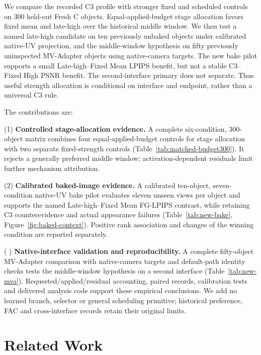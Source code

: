 \documentclass[times,twocolumn,final]{elsarticle}
\providecommand{\DIFadd}[1]{{\protect\color{blue} \sf #1}} %
\providecommand{\DIFaddbegin}{} %
\providecommand{\DIFaddend}{} %
\begin{document}
 
 \DIFaddbegin \DIFadd{We compare the recorded C3 profile with stronger fixed and scheduled controls on 300 held-out Fresh C objects. Equal-applied-budget stage allocation favors fixed mean and late-high over the historical middle window. We then test a named late-high candidate on ten previously unbaked objects under calibrated native-UV projection, and the middle-window hypothesis on fifty previously uninspected MV-Adapter objects using native-camera targets. The new bake pilot supports a small Late-high--Fixed Mean LPIPS benefit, but not a stable C3--Fixed High PSNR benefit. The second-interface primary does not separate. Thus useful strength allocation is conditional on interface and endpoint, rather than a universal C3 rule}\DIFaddend .

The   \DIFaddbegin \DIFadd{contributions are}\DIFaddend :

(1)   \DIFaddbegin \DIFadd{\textbf{Controlled stage-allocation evidence.} A complete six-condition, 300-object matrix combines four equal-applied-budget controls for stage allocation with two separate fixed-strength controls (Table~\ref{tab:matched-budget300}). It rejects a generally preferred middle window; activation-dependent residuals limit further mechanism attribution}\DIFaddend .

(2)  
 \DIFaddbegin \DIFadd{\textbf{Calibrated baked-image evidence.} A calibrated ten-object, seven-condition native-UV bake pilot evaluates eleven unseen views per object and supports the named Late-high--Fixed Mean FG-LPIPS contrast, while retaining C3 counterevidence and actual appearance failures (Table~\ref{tab:new-bake}, Figure~\ref{fig:baked-context}). Positive rank association and changes of the winning condition are reported separately}\DIFaddend .

(  \DIFaddbegin \DIFadd{3) \textbf{Native-interface validation and reproducibility.} A complete fifty-object MV-Adapter comparison with native-camera targets and default-path identity checks tests the middle-window hypothesis on a second interface (Table~\ref{tab:new-mva}). Requested/applied/residual accounting, paired records, calibration tests and delivered analysis code support these empirical conclusions. We add no learned branch, selector or general scheduling primitive; historical preference, FAC and cross-interface records retain their original limits}\DIFaddend .

\section{Related Work}
\label{sec:related}
\end{document}
